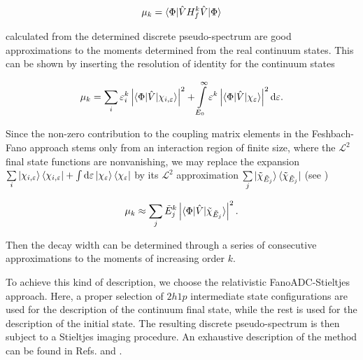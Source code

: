 \begin{equation}
 \mu_k = \braket{ \Phi | \hat{V} H^k_f \hat{V} | \Phi }
\end{equation}

calculated from the determined
discrete pseudo-spectrum are good approximations to the moments determined
from the real continuum states.
This can be shown by inserting the resolution of identity for
the continuum states

\begin{equation}
 \mu_k = \sum_i \varepsilon_i^k
         \left| \braket{ \Phi | \hat{V} | \chi_{i,\varepsilon} } \right| ^2
       + \int\limits_{E_{0}}^{\infty} \varepsilon^k
         \left| \braket{\Phi|\hat{V}|\chi_{\varepsilon}} \right|^2 \mathrm{d}\varepsilon  .
\end{equation}

Since the non-zero contribution to the coupling matrix elements in the
Feshbach-Fano approach stems only
from an interaction region of finite size, where the $\mathcal{L}^2$ final
state functions are nonvanishing, we may replace the expansion
$\sum\limits_i \ket{\chi_{i,\varepsilon}} \bra{\chi_{i,\varepsilon}}
 + \int \mathrm{d}\varepsilon \ket{\chi_\varepsilon} \bra{\chi_\varepsilon}$
by its $\mathcal{L}^2$ approximation
$\sum\limits_j \ket{\tilde{\chi}_{\tilde{E}_j}} \bra{\tilde{\chi}_{\tilde{E}_j}}$
(see \cite{Reinhardt79})

\begin{equation}
 \label{eq:moment_discrete}
 \mu_k \approx \sum\limits_j \tilde{E}_j ^k
         \left| \braket{\Phi|\hat{V}|\tilde{\chi}_{\tilde{E}_j}}  \right|^2 .
\end{equation}

Then the decay width can be determined through a series of
consecutive approximations to the moments of increasing order $k$.

To achieve this kind of description, we choose the relativistic
FanoADC-Stieltjes approach.
Here, a proper selection of $2h1p$ intermediate state configurations are used
for the description of the continuum final state,
while the rest is used for the description
of the initial state.
The resulting discrete pseudo-spectrum
is then subject to a Stieltjes imaging procedure.
An exhaustive description of the method can be found in Refs. \cite{Fasshauer15_1}
and \cite{Fasshauer_thesis}.
